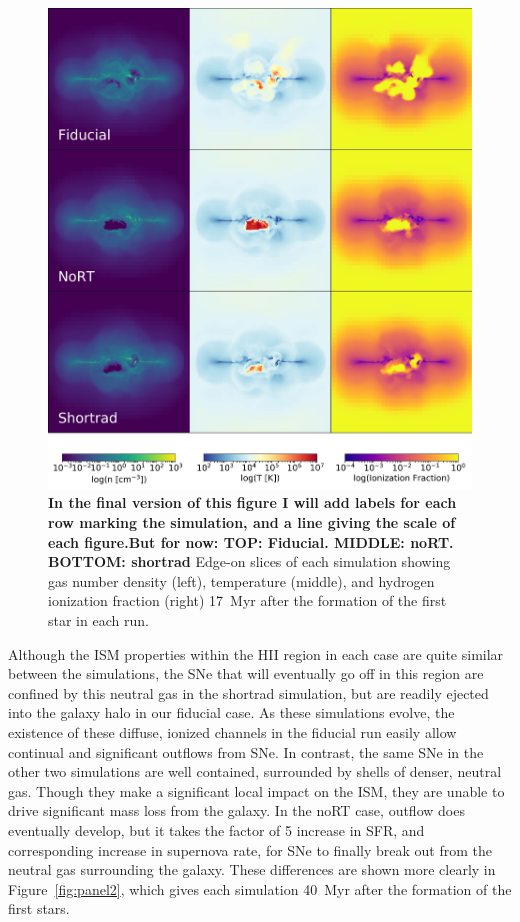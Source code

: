 \documentclass[twocolumn]{aastex62}
\begin{document}
\begin{figure}
\centering
\includegraphics[width=0.99\linewidth]{DD0136_fiducial_shortrad_nort}
\caption{\textbf{In the final version of this figure I will add labels for each row marking the simulation, and a line giving the scale of each figure.But for now: TOP: Fiducial. MIDDLE: noRT. BOTTOM: shortrad} Edge-on slices of each simulation showing gas number density (left), temperature (middle), and hydrogen ionization fraction (right) 17~Myr after the formation of the first star in each run.}
\label{fig:panel1}
\end{figure}

Although the ISM properties within the HII region in each case are quite similar between the simulations, the SNe that will eventually go off in this region are confined by this neutral gas in the shortrad simulation, but are readily ejected into the galaxy halo in our fiducial case. As these simulations evolve, the existence of these diffuse, ionized channels in the fiducial run easily allow continual and significant outflows from SNe. In contrast, the same SNe in the other two simulations are well contained, surrounded by shells of denser, neutral gas. Though they make a significant local impact on the ISM, they are unable to drive significant mass loss from the galaxy. In the noRT case, outflow does eventually develop, but it takes the factor of 5 increase in SFR, and corresponding increase in supernova rate, for SNe to finally break out from the neutral gas surrounding the galaxy. These differences are shown more clearly in Figure~\ref{fig:panel2}, which gives each simulation 40~Myr after the formation of the first stars. 
\end{document}
